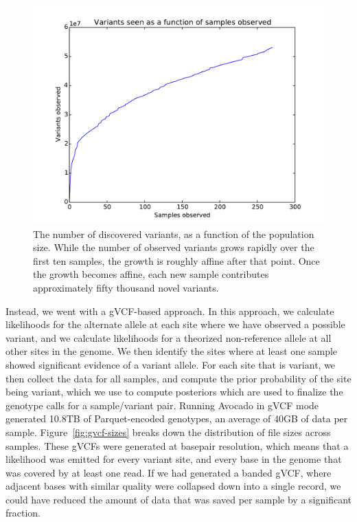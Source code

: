 \documentclass[phd]{ucbthesis}
\begin{document}
\begin{figure}[h]
  \begin{center}
    \includegraphics[width=0.95\linewidth]{graphs/variant_counts.pdf}
  \end{center}
  \caption{The number of discovered variants, as a function of the population
    size. While the number of observed variants grows rapidly over the first
    ten samples, the growth is roughly affine after that point. Once the
    growth becomes affine, each new sample contributes approximately fifty
    thousand novel variants.}
  \label{fig:variants-in-population}
\end{figure}

Instead, we went with a gVCF-based approach. In this approach, we calculate
likelihoods for the alternate allele at each site where we have observed a
possible variant, and we calculate likelihoods for a theorized non-reference
allele at all other sites in the genome. We then identify the sites where at
least one sample showed significant evidence of a variant allele. For each
site that is variant, we then collect the data for all samples, and compute
the prior probability of the site being variant, which we use to compute
posteriors which are used to finalize the genotype calls for a sample/variant
pair. Running Avocado in gVCF mode generated 10.8TB of Parquet-encoded
genotypes, an average of 40GB of data per sample. Figure~\ref{fig:gvcf-sizes}
breaks down the distribution of file sizes across samples. These gVCFs were
generated at basepair resolution, which means that a likelihood was emitted
for every variant site, and every base in the genome that was covered by at
least one read. If we had generated a banded gVCF, where adjacent bases with
similar quality were collapsed down into a single record, we could have reduced
the amount of data that was saved per sample by a significant fraction.
\end{document}
